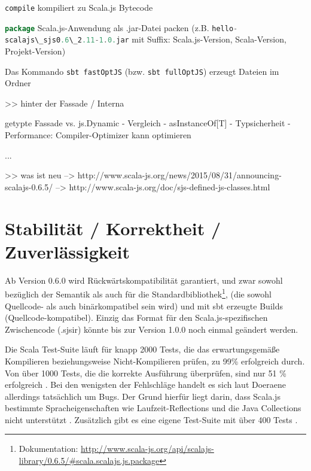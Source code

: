 \documentclass[a4paper, 12pt, hidelinks, listof=totoc, listoftables=totoc, bibliography=totoc]{scrreprt}
\newcommand{\code}[1]{\lstinline[language=Scala, style=inline]|#1|}
\begin{document}
\code{compile} kompiliert zu Scala.js Bytecode

\code{package} Scala.js-Anwendung als .jar-Datei packen (z.B. \code{hello-scalajs\_sjs0.6\_2.11-1.0.jar} mit Suffix: Scala.js-Version, Scala-Version, Projekt-Version)






Das Kommando \code{sbt fastOptJS} (bzw. \code{sbt fullOptJS}) erzeugt Dateien im Ordner












>> hinter der Fassade / Interna

getypte Fassade vs. js.Dynamic
- Vergleich
- asInstanceOf[T]
  - Typsicherheit
  - Performance: Compiler-Optimizer kann optimieren

...






>> was ist neu
  -->  http://www.scala-js.org/news/2015/08/31/announcing-scalajs-0.6.5/
  -->  http://www.scala-js.org/doc/sjs-defined-js-classes.html





\section{Stabilität / Korrektheit / Zuverlässigkeit}

Ab Version 0.6.0 wird Rückwärtskompatibilität garantiert, und zwar sowohl bezüglich der Semantik als auch für die Standardbibliothek\footnote{Dokumentation: \url{http://www.scala-js.org/api/scalajs-library/0.6.5/\#scala.scalajs.js.package}}, (die sowohl Quellcode- als auch binärkompatibel sein wird) und mit sbt erzeugte Builds (Quellcode-kompatibel). Einzig das Format für den Scala.js-spezifischen Zwischencode (.sjsir) könnte bis zur Version 1.0.0 noch einmal geändert werden.

Die Scala Test-Suite läuft für knapp 2000 Tests, die das erwartungsgemäße Kompilieren beziehungsweise Nicht-Kompilieren prüfen, zu 99\% erfolgreich durch. Von über 1000 Tests, die die korrekte Ausführung überprüfen, sind nur 51 \% erfolgreich \cite[Folie 36, Min. 35]{doeraene2014.WHB}. Bei den wenigsten der Fehlschläge handelt es sich laut Doeraene allerdings tatsächlich um Bugs. Der Grund hierfür liegt darin, dass Scala.js bestimmte Spracheigenschaften wie Laufzeit-Reflections und die Java Collections nicht unterstützt \cite[S. 7]{doeraene2013.TDI}. Zusätzlich gibt es eine eigene Test-Suite mit über 400 Tests \cite[Folie 36, Min. 35]{doeraene2014.WHB}.
\end{document}
